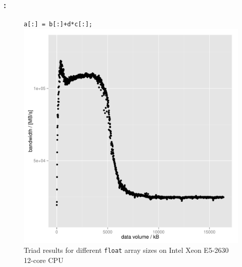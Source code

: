 \documentclass[9pt,xcolor=table]{beamer}
\begin{document}
\begin{frame}
\frametitle{\insertsectionhead{}: \insertsubsection{}}
\begin{figure}[htb]\Large
  \texttt{a[:] = b[:]+d*c[:];}\\
  \includegraphics[height=0.65\textheight]{plots/openmp_stream_sweep_bw_vs_size_first_16_mb}\\[2pt]\small
  Triad results for different \texttt{float} array sizes on Intel\textregistered{} Xeon\textregistered{} E5-2630 12-core CPU 
\end{figure}
\end{frame}
\end{document}
